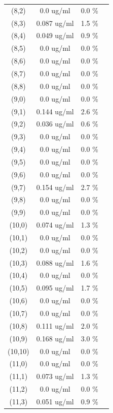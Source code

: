 \documentclass{article}
\begin{document}
\begin{tabular}{c c c c}
(8,2)&        0.0 ug/ml        &0.0 \%\\
(8,3)&        0.087 ug/ml        &1.5 \%\\
(8,4)&        0.049 ug/ml        &0.9 \%\\
(8,5)&        0.0 ug/ml        &0.0 \%\\
(8,6)&        0.0 ug/ml        &0.0 \%\\
(8,7)&        0.0 ug/ml        &0.0 \%\\
(8,8)&        0.0 ug/ml        &0.0 \%\\
(9,0)&        0.0 ug/ml        &0.0 \%\\
(9,1)&        0.144 ug/ml        &2.6 \%\\
(9,2)&        0.036 ug/ml        &0.6 \%\\
(9,3)&        0.0 ug/ml        &0.0 \%\\
(9,4)&        0.0 ug/ml        &0.0 \%\\
(9,5)&        0.0 ug/ml        &0.0 \%\\
(9,6)&        0.0 ug/ml        &0.0 \%\\
(9,7)&        0.154 ug/ml        &2.7 \%\\
(9,8)&        0.0 ug/ml        &0.0 \%\\
(9,9)&        0.0 ug/ml        &0.0 \%\\
(10,0)&        0.074 ug/ml        &1.3 \%\\
(10,1)&        0.0 ug/ml        &0.0 \%\\
(10,2)&        0.0 ug/ml        &0.0 \%\\
(10,3)&        0.088 ug/ml        &1.6 \%\\
(10,4)&        0.0 ug/ml        &0.0 \%\\
(10,5)&        0.095 ug/ml        &1.7 \%\\
(10,6)&        0.0 ug/ml        &0.0 \%\\
(10,7)&        0.0 ug/ml        &0.0 \%\\
(10,8)&        0.111 ug/ml        &2.0 \%\\
(10,9)&        0.168 ug/ml        &3.0 \%\\
(10,10)&        0.0 ug/ml        &0.0 \%\\
(11,0)&        0.0 ug/ml        &0.0 \%\\
(11,1)&        0.073 ug/ml        &1.3 \%\\
(11,2)&        0.0 ug/ml        &0.0 \%\\
(11,3)&        0.051 ug/ml        &0.9 \%\\

\end{tabular}
\end{document}
